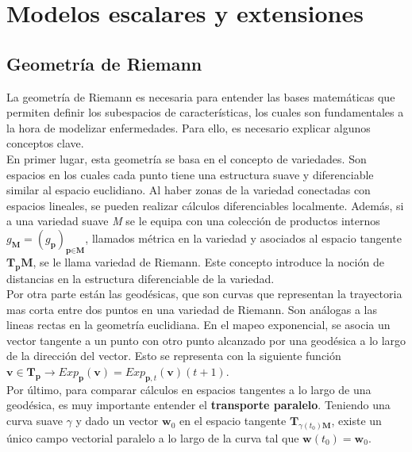 \documentclass[12pt]{article}
\begin{document}
\section{Modelos escalares y extensiones}
\subsection{Geometría de Riemann}
La geometría de Riemann es necesaria para entender las bases matemáticas que permiten definir los subespacios de características, los cuales son fundamentales a la hora de modelizar enfermedades. Para ello, es necesario explicar algunos conceptos clave. \\

En primer lugar, esta geometría se basa en el concepto de variedades. Son espacios en los cuales cada punto tiene una estructura suave y diferenciable similar al espacio euclidiano. Al haber zonas de la variedad conectadas con espacios lineales, se pueden realizar cálculos diferenciables localmente. Además, si a una variedad suave \textit{M} se le equipa con una colección de productos internos $g_{\textbf{M}}=(g_{\textbf{p}})_{\textbf{p}\in \textbf{M}}$, llamados métrica en la variedad y asociados al espacio tangente $\textbf{T}_{\textbf{p}}\textbf{M}$, se le llama variedad de Riemann. Este concepto introduce la noción de distancias en la estructura diferenciable de la variedad.\\

Por otra parte están las geodésicas, que son curvas que representan la trayectoria mas corta entre dos puntos en una variedad de Riemann. Son análogas a las lineas rectas en la geometría euclidiana. En el mapeo exponencial, se asocia un vector tangente a un punto con otro punto alcanzado por una geodésica a lo largo de la dirección del vector. Esto se representa con la siguiente función $\textbf{v}\in\textbf{T}_{\textbf{p}}\rightarrow Exp_{\textbf{p}}(\textbf{v})=Exp_{\textbf{p},t}(\textbf{v})(t+1)$.\\

Por último, para comparar cálculos en espacios tangentes a lo largo de una geodésica, es muy importante entender el \textbf{transporte paralelo}. Teniendo una curva suave $\gamma$ y dado un vector $\textbf{w}_{0}$ en el espacio tangente $\textbf{T}_{\gamma(t_{0})\textbf{M}}$, existe un único campo vectorial paralelo a lo largo de la curva tal que $\textbf{w}(t_{0})=\textbf{w}_{0}$.
\end{document}
